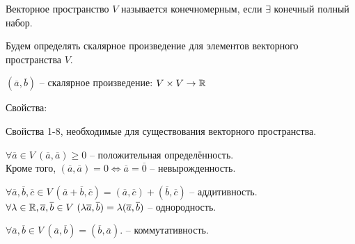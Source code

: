 	\begin{Def}
		Векторное пространство $V$ называется конечномерным, если $\exists$ конечный полный набор.
	\end{Def}

    \gdef\AuthorName{Дарья Гольденберг}

	Будем определять скалярное произведение для элементов векторного пространства $V$.
	
	\begin{Def}
	  $(\overline{a}, \overline{b})$ -- скалярное произведение: $V \times V \to \mathbb{R}$
	\end{Def}
	
	Свойства:
	\begin{MyList}
		\item Свойства 1-8, необходимые для существования векторного пространства.
		\item $\forall \overline{a} \in V \ (\overline{a}, \overline{a}) \geqslant 0$ -- положительная определённость. \\
		Кроме того, $(\overline{a}, \overline{a}) = 0 \Leftrightarrow \overline{a} = \overline{0}$ -- невырожденность.
		\item $\forall \overline{a}, \overline{b}, \overline{c} \in V \ (\overline{a} + \overline{b}, \overline{c}) = (\overline{a}, \overline{c}) + (\overline{b}, \overline{c})$ -- аддитивность.\\
		$\forall \lambda \in \mathbb{R}, \overline{a}, \overline{b} \in V \ (\lambda \overline{a}, \overline{b}) = \lambda(\overline{a}, \overline{b})$ -- однородность.
		\item $\forall \overline{a}, \overline{b} \in V \ (\overline{a}, \overline{b}) = (\overline{b}, \overline{a})$. -- коммутативность.
	\end{MyList}
  

